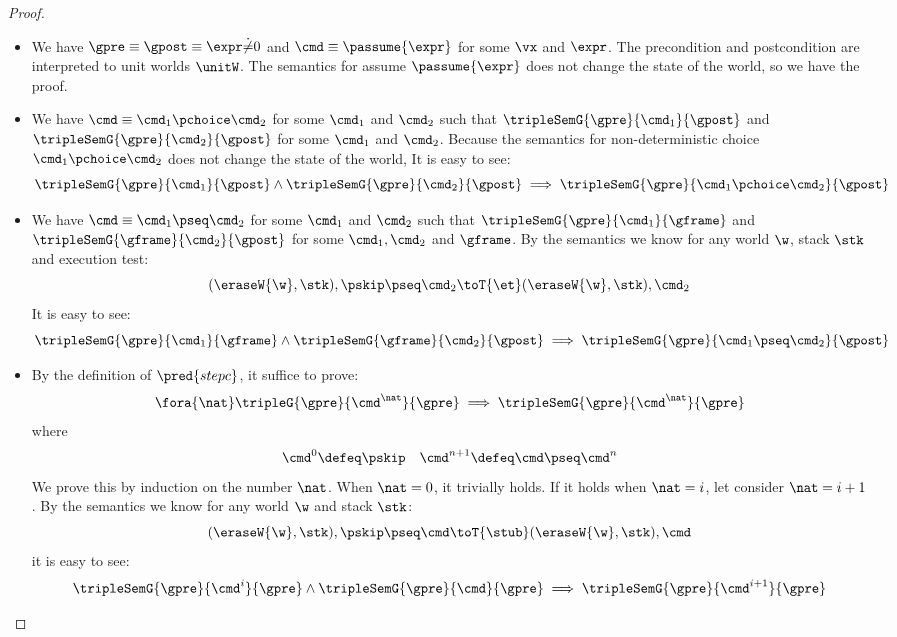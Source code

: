 \begin{proof}
\begin{itemize}
\item {}
We have \( \gpre \equiv \gpost \equiv \expr \dot\neq 0\) and \( \cmd \equiv \passume{\expr}\) for some \( \vx \) and \( \expr \).
The precondition and postcondition are interpreted to unit worlds \( \unitW\).
The semantics for assume \( \passume{\expr} \) does not change the state of the world, so we have the proof.

\item {}
We have \( \cmd \equiv \cmd_1 \pchoice \cmd_2 \) for some \( \cmd_1 \) and \( \cmd_2 \) such that \( \tripleSemG{\gpre}{\cmd_1}{\gpost} \) and \( \tripleSemG{\gpre}{\cmd_2}{\gpost} \) for some \( \cmd_1 \) and \( \cmd_2 \).
Because the semantics for non-deterministic choice \( \cmd_1 \pchoice \cmd_2 \) does not change the state of the world, It is easy to see:
\[
    \tripleSemG{\gpre}{\cmd_1}{\gpost} \land \tripleSemG{\gpre}{\cmd_2}{\gpost} \implies \tripleSemG{\gpre}{\cmd_1 \pchoice \cmd_2}{\gpost}
\]

\item {}
We have \( \cmd \equiv \cmd_1 \pseq \cmd_2 \) for some \( \cmd_1 \) and \( \cmd_2 \) such that \( \tripleSemG{\gpre}{\cmd_1}{\gframe} \) and \( \tripleSemG{\gframe}{\cmd_2}{\gpost} \) for some \( \cmd_1, \cmd_2\) and \( \gframe \).
By the semantics  we know for any world \( \w \), stack \( \stk \) and execution test:
\[
    (\eraseW{\w}, \stk), \pskip \pseq \cmd_2 \toT{\et} (\eraseW{\w}, \stk), \cmd_2
\]
It is easy to see:
\[
    \tripleSemG{\gpre}{\cmd_1 }{\gframe} \land \tripleSemG{\gframe}{\cmd_2}{\gpost} \implies \tripleSemG{\gpre}{\cmd_1 \pseq \cmd_2}{\gpost}
\]

\item {}
By the definition of \( \pred{stepc}\), it suffice to prove:
\[
    \fora{\nat} \tripleG{\gpre}{\cmd^{\nat}}{\gpre} \implies \tripleSemG{\gpre}{\cmd^{\nat}}{\gpre} 
\]
where
\[
    \cmd^{0} \defeq \pskip \quad \cmd^{n + 1} \defeq \cmd \pseq \cmd^{n}
\]
We prove this by induction on the number \( \nat \).
When \( \nat = 0 \), it trivially holds.
If it holds when \( \nat = i\), let consider \( \nat = i + 1 \).
By the semantics  we know for any world \( \w \) and stack \( \stk \):
\[
    (\eraseW{\w}, \stk), \pskip \pseq \cmd \toT{\stub} (\eraseW{\w}, \stk), \cmd
\]
it is easy to see:
\[
    \tripleSemG{\gpre}{\cmd^{i}}{\gpre} \land \tripleSemG{\gpre}{\cmd}{\gpre} \implies \tripleSemG{\gpre}{\cmd^{i+1}}{\gpre} 
\]


\end{itemize}
\end{proof}

